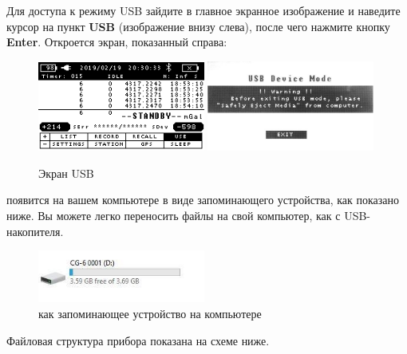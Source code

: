 Для доступа к режиму USB зайдите в главное экранное изображение и наведите
курсор на пункт \textbf{USB} (изображение внизу слева), после чего нажмите
кнопку \textbf{Enter}.  Откроется экран, показанный справа:

\begin{figure}[h]
  \centering
  \includegraphics[width=0.49\textwidth]{figures/the_usb_screen_1}
  \includegraphics[width=0.49\textwidth]{figures/the_usb_screen_2}
  \caption{Экран USB}
  \label{fig:the_usb_screen}
\end{figure}


\cg{} появится на вашем компьютере в виде запоминающего устройства, как показано
ниже. Вы можете легко переносить файлы на свой компьютер, как с USB-накопителя.

\begin{figure}[h]
  \centering
  \includegraphics[width=0.49\textwidth]{figures/the_cg6_autograv_as_a_mass_storage_device_on_your_computer}
  \caption{\cg{} как запоминающее устройство на компьютере}
  \label{fig:the_cg6_autograv_as_a_mass_storage_device_on_your_computer}
\end{figure}

Файловая структура прибора \cg{} показана на схеме ниже.

